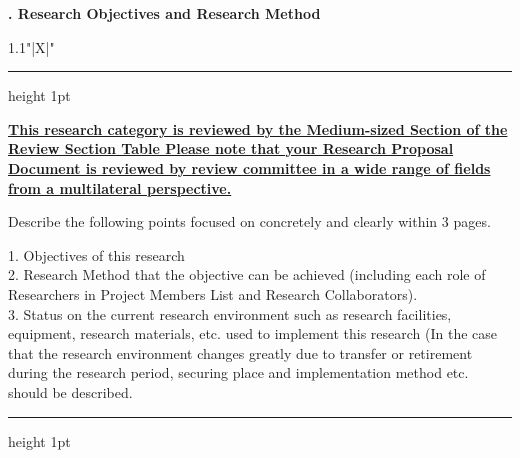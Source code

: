 \documentclass[8pt]{extarticle}
\makeatletter
\newcommand{\thickhline}{%
	\noalign {\ifnum 0=`}\fi \hrule height 1pt
	\futurelet \reserved@a \@xhline
}
\makeatother
\begin{document}
	
\noindent\textbf{\fontsize{12}{12}. Research Objectives and Research Method}\\
\begin{tabularx}{1.1\linewidth}{"|X|"}
	\thickhline
	\underline{\textbf{This research category is reviewed by the Medium-sized Section of the Review Section Table Please note that your Research Proposal}}\\
	\underline{\textbf{Document is reviewed by review committee in a wide range of fields from a multilateral perspective.}}
	
	Describe the following points focused on concretely and clearly within 3 pages.
	
	1. Objectives of this research\\
	2. Research Method that the objective can be achieved (including each role of Researchers in Project Members List and Research Collaborators).\\
	3. Status on the current research environment such as research facilities, equipment, research materials, etc. used to implement this research (In the case that the research environment changes greatly due to transfer or retirement during the research period, securing place and implementation method etc. should be described. 
	\\
	\thickhline
\end{tabularx}
\end{document}
